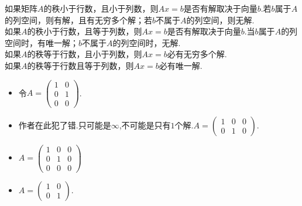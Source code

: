 ﻿\documentclass{book} \usepackage{exsheets} \usepackage{xeCJK}
\begin{document}
\begin{solution}
  如果矩阵$A$的秩小于行数，且小于列数，则$Ax=b$是否有解取决于向量$b$.若$b$属于$A$的列空间，则有解，且有无穷多个解；若$b$不属于$A$的列空间，则无解.\\

  如果$A$的秩小于行数，且等于列数，则$Ax=b$是否有解取决于向量$b$.当$b$属于$A$的列空间时，有唯一解；$b$不属于$A$的列空间时，无解.\\

  如果$A$的秩等于行数，且小于列数，则$Ax=b$必有无穷多个解.\\

  如果$A$的秩等于行数且等于列数，则$Ax=b$必有唯一解.
  \begin{itemize}
  \item 令$A=
    \begin{pmatrix}
      1&0\\
      0&1\\
      0&0
    \end{pmatrix}
    $.
  \item 作者在此犯了错.只可能是$\infty$,不可能是只有$1$个解.$A=
    \begin{pmatrix}
      1&0&0\\
      0&1&0
    \end{pmatrix}.  $
  \item $A=
    \begin{pmatrix}
      1&0&0\\
      0&1&0\\
      0&0&0
    \end{pmatrix}
    $
  \item $A=
    \begin{pmatrix}
      1&0\\
      0&1
    \end{pmatrix}.  $
  \end{itemize}
\end{solution}
\end{document}
